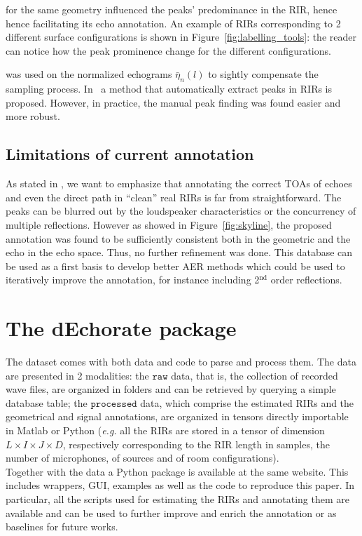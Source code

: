  for the same geometry influenced the peaks' predominance in the RIR, hence hence facilitating its echo annotation. An example of RIRs corresponding to 2 different surface configurations is shown in Figure~\ref{fig:labelling_tools}: the reader can notice how the peak prominence change for the different configurations.

 was used on the normalized echograms $\bar{\eta}_{n}(l)$ to sightly compensate the sampling process. In~ a method that automatically extract peaks in RIRs is proposed. However, in practice, the manual peak finding was found easier and more robust.

\subsection{Limitations of current annotation}
As stated in , we want to emphasize that annotating the correct TOAs of echoes and even the direct path in ``clean'' real RIRs is far from straightforward. The peaks can be blurred out by the loudspeaker characteristics or the concurrency of multiple reflections. However as showed in Figure~\ref{fig:skyline}, the proposed annotation was found to be sufficiently consistent both in the geometric and the echo in the echo space. Thus, no further refinement was done. This database can be used as a first basis to develop better AER methods which could be used to iteratively improve the annotation, for instance including  2$^\text{nd}$ order reflections.

\section{The dEchorate package}
The dataset comes with both data and code to parse and process them. The data are presented in 2 modalities: the $\mathtt{raw}$ data, that is, the collection of recorded wave files, are organized in folders and can be retrieved by querying a simple database table; the $\mathtt{processed}$ data, which comprise the estimated RIRs and the geometrical and signal annotations, are organized in tensors directly importable in Matlab or Python (\textit{e.g.} all the RIRs are stored in a tensor of dimension $L \times I \times J \times D$, respectively corresponding to the RIR length in samples, the number of microphones, of sources and of room configurations).
\\Together with the data a Python package is available at the same website. This includes wrappers, GUI, examples as well as the code to reproduce this paper.
In particular, all the scripts used for estimating the RIRs and annotating them are available and can be used to further improve and enrich the annotation or as baselines for future works.

